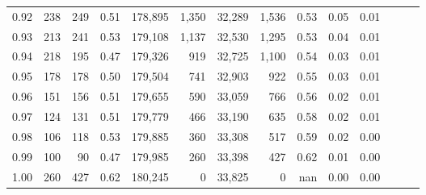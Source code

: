 \begin{tabular}{rrrrrrrrrrrrrr}
0.92 &    238 &  249 &  0.51 &  178,895 &    1,350 &  32,289 &   1,536 &  0.53 &  0.05 &      0.01 \\
0.93 &    213 &  241 &  0.53 &  179,108 &    1,137 &  32,530 &   1,295 &  0.53 &  0.04 &      0.01 \\
0.94 &    218 &  195 &  0.47 &  179,326 &      919 &  32,725 &   1,100 &  0.54 &  0.03 &      0.01 \\
0.95 &    178 &  178 &  0.50 &  179,504 &      741 &  32,903 &     922 &  0.55 &  0.03 &      0.01 \\
0.96 &    151 &  156 &  0.51 &  179,655 &      590 &  33,059 &     766 &  0.56 &  0.02 &      0.01 \\
0.97 &    124 &  131 &  0.51 &  179,779 &      466 &  33,190 &     635 &  0.58 &  0.02 &      0.01 \\
0.98 &    106 &  118 &  0.53 &  179,885 &      360 &  33,308 &     517 &  0.59 &  0.02 &      0.00 \\
0.99 &    100 &   90 &  0.47 &  179,985 &      260 &  33,398 &     427 &  0.62 &  0.01 &      0.00 \\
1.00 &    260 &  427 &  0.62 &  180,245 &        0 &  33,825 &       0 &   nan &  0.00 &      0.00 \\
\bottomrule
\end{tabular}
